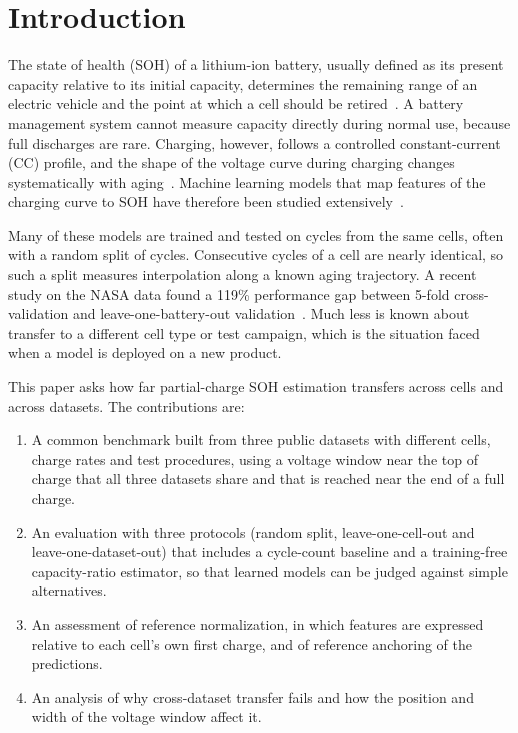 \documentclass[conference]{IEEEtran}
\begin{document}
\section{Introduction}
The state of health (SOH) of a lithium-ion battery, usually defined as its present capacity relative to its initial capacity, determines the remaining range of an electric vehicle and the point at which a cell should be retired~\cite{berecibar2016review}. A battery management system cannot measure capacity directly during normal use, because full discharges are rare. Charging, however, follows a controlled constant-current (CC) profile, and the shape of the voltage curve during charging changes systematically with aging~\cite{dubarry2011ica,weng2013ica}. Machine learning models that map features of the charging curve to SOH have therefore been studied extensively~\cite{li2019review,richardson2017gpr,roman2021pipeline,tian2021charging}.

Many of these models are trained and tested on cycles from the same cells, often with a random split of cycles. Consecutive cycles of a cell are nearly identical, so such a split measures interpolation along a known aging trajectory. A recent study on the NASA data found a 119\% performance gap between 5-fold cross-validation and leave-one-battery-out validation~\cite{le2026charging}. Much less is known about transfer to a different cell type or test campaign, which is the situation faced when a model is deployed on a new product.

This paper asks how far partial-charge SOH estimation transfers across cells and across datasets. The contributions are:
\begin{enumerate}
\item A common benchmark built from three public datasets with different cells, charge rates and test procedures, using a voltage window near the top of charge that all three datasets share and that is reached near the end of a full charge.
\item An evaluation with three protocols (random split, leave-one-cell-out and leave-one-dataset-out) that includes a cycle-count baseline and a training-free capacity-ratio estimator, so that learned models can be judged against simple alternatives.
\item An assessment of reference normalization, in which features are expressed relative to each cell's own first charge, and of reference anchoring of the predictions.
\item An analysis of why cross-dataset transfer fails and how the position and width of the voltage window affect it.
\end{enumerate}
\end{document}
